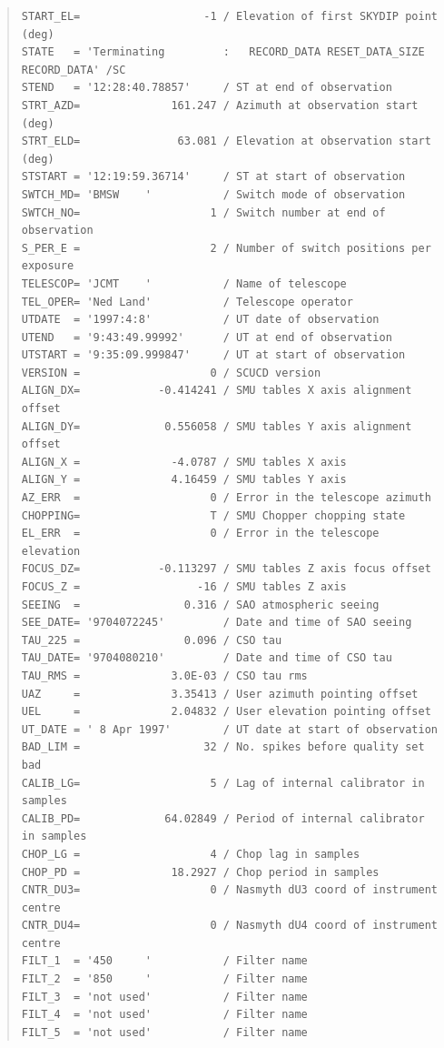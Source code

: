 \documentclass[twoside,11pt]{article}
\newenvironment{myquote}{\begin{quote}\begin{small}}{\end{small}\end{quote}}
\renewcommand{\_}{\texttt{\symbol{95}}}
\begin{document}
\begin{myquote}
\begin{verbatim}
START_EL=                   -1 / Elevation of first SKYDIP point (deg)
STATE   = 'Terminating         :   RECORD_DATA RESET_DATA_SIZE RECORD_DATA' /SC
STEND   = '12:28:40.78857'     / ST at end of observation
STRT_AZD=              161.247 / Azimuth at observation start (deg)
STRT_ELD=               63.081 / Elevation at observation start (deg)
STSTART = '12:19:59.36714'     / ST at start of observation
SWTCH_MD= 'BMSW    '           / Switch mode of observation
SWTCH_NO=                    1 / Switch number at end of observation
S_PER_E =                    2 / Number of switch positions per exposure
TELESCOP= 'JCMT    '           / Name of telescope
TEL_OPER= 'Ned Land'           / Telescope operator
UTDATE  = '1997:4:8'           / UT date of observation
UTEND   = '9:43:49.99992'      / UT at end of observation
UTSTART = '9:35:09.999847'     / UT at start of observation
VERSION =                    0 / SCUCD version
ALIGN_DX=            -0.414241 / SMU tables X axis alignment offset
ALIGN_DY=             0.556058 / SMU tables Y axis alignment offset
ALIGN_X =              -4.0787 / SMU tables X axis
ALIGN_Y =              4.16459 / SMU tables Y axis
AZ_ERR  =                    0 / Error in the telescope azimuth
CHOPPING=                    T / SMU Chopper chopping state
EL_ERR  =                    0 / Error in the telescope elevation
FOCUS_DZ=            -0.113297 / SMU tables Z axis focus offset
FOCUS_Z =                  -16 / SMU tables Z axis
SEEING  =                0.316 / SAO atmospheric seeing
SEE_DATE= '9704072245'         / Date and time of SAO seeing
TAU_225 =                0.096 / CSO tau
TAU_DATE= '9704080210'         / Date and time of CSO tau
TAU_RMS =              3.0E-03 / CSO tau rms
UAZ     =              3.35413 / User azimuth pointing offset
UEL     =              2.04832 / User elevation pointing offset
UT_DATE = ' 8 Apr 1997'        / UT date at start of observation
BAD_LIM =                   32 / No. spikes before quality set bad
CALIB_LG=                    5 / Lag of internal calibrator in samples
CALIB_PD=             64.02849 / Period of internal calibrator in samples
CHOP_LG =                    4 / Chop lag in samples
CHOP_PD =              18.2927 / Chop period in samples
CNTR_DU3=                    0 / Nasmyth dU3 coord of instrument centre
CNTR_DU4=                    0 / Nasmyth dU4 coord of instrument centre
FILT_1  = '450     '           / Filter name
FILT_2  = '850     '           / Filter name
FILT_3  = 'not used'           / Filter name
FILT_4  = 'not used'           / Filter name
FILT_5  = 'not used'           / Filter name

\end{verbatim}
\end{myquote}
\end{document}
